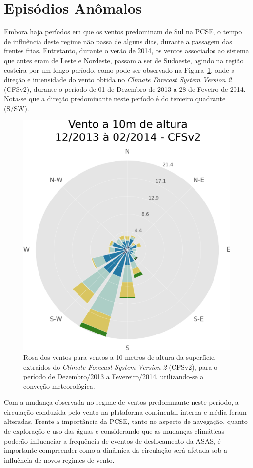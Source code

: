 \section{Episódios Anômalos}
\label{sec:anomamlousEpisodes}

\hspace{5mm} 

\hspace{5mm} Embora haja períodos em que os ventos predominam de Sul na PCSE, o tempo de
influência deste regime não passa de alguns dias, durante a passagem das frentes frias.
Entretanto, durante o verão de 2014, os ventos associados ao sistema que antes eram de Leste e
Nordeste, passam a ser de Sudoeste, agindo na região costeira por um longo período, como
pode ser observado na Figura~\ref{fig:a701}, onde a direção e intensidade do vento
obtida no \textit{Climate Forecast System Version 2} (CFSv2), durante o período de
01 de Dezembro de 2013 a 28 de Feveiro de 2014. Nota-se que a direção
predominante neste período é do terceiro quadrante (S/SW).

\begin{figure}[!h]
    \centering
    \includegraphics[width=0.65\linewidth]{figuras/windrose_2014CFSv2_comTitulo.png}
\caption[Rosa dos Ventos para Dezembro/2013 a Fevereiro/2014]{Rosa dos ventos para ventos a 10 metros de altura da superfície, extraídos do \textit{Climate Forecast System Version 2} (CFSv2), para o período de Dezembro/2013 a Fevereiro/2014, utilizando-se a conveção meteorológica.}
    \label{fig:a701}
\end{figure}

\hspace{5mm} Com a mudança observada no regime de ventos predominante neste período, a circulação conduzida pelo vento
na plataforma continental interna e média foram alteradas. 
Frente a importância da PCSE, tanto no aspecto de navegação, quanto de
exploração e uso das águas e considerando que as mudanças climáticas poderão
influenciar a frequência de eventos de deslocamento da ASAS, é importante compreender
como a dinâmica da circulação será afetada sob a influência de novos regimes
de vento.

